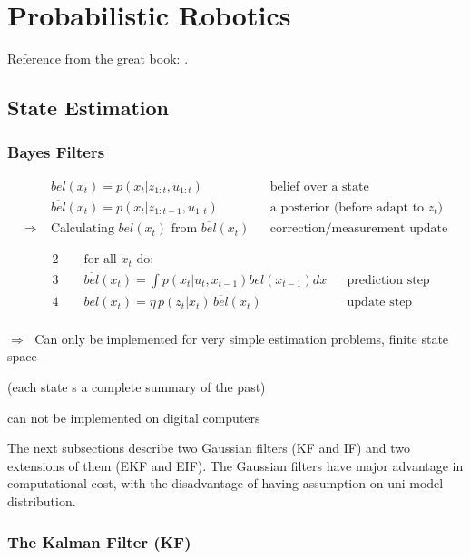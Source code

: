 \chapter{Probabilistic Robotics}

Reference from the great book: \cite{thrun2006probalistic}.

\section{State Estimation}
\subsection{Bayes Filters}
\begin{align*}
	&bel(x_t) = p(x_t | z_{1:t}, u_{1:t}) && \text{belief over a state}\\
	&\overline{bel}(x_t) = p(x_t | z_{1:t-1}, u_{1:t}) && \text{a posterior (before adapt to }z_t)\\
	\Rightarrow\; & \text{Calculating } bel(x_t) \text{ from  } \overline{bel}(x_t) && \text{correction/measurement update}
\end{align*}

\begin{align*}
	&2 \qquad \text{for all } x_t \text{ do:}\\
	&3 \qquad \overline{bel}(x_t) = \int p(x_t | u_t, x_{t-1}) bel(x_{t-1}) dx && \text{prediction step}\\
	&4 \qquad bel(x_t) = \eta\, p(z_t | x_t)\, \overline{bel}(x_t) && \text{update step}
\end{align*}\\
$\Rightarrow\;$ Can only be implemented for very simple estimation problems, finite state space

 (each state s a complete summary of the past)

 can not be implemented on digital computers

The next subsections describe two Gaussian filters (\ac{KF} and \ac{IF}) and two extensions of them (\ac{EKF} and \ac{EIF}). The Gaussian filters have major advantage in computational cost, with the disadvantage of having assumption on uni-model distribution.

\subsection{The Kalman Filter (KF)}

